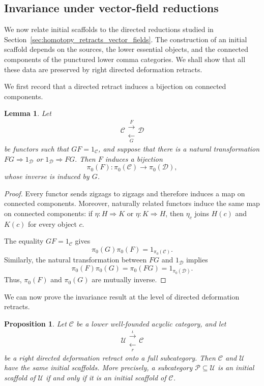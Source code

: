 \documentclass[12pt]{amsart}
\newtheorem{lemma}[teo]{Lemma}
\newtheorem{proposition}[teo]{Proposition}
\theoremstyle{definition}
\theoremstyle{remark}
\numberwithin{figure}{section}%
\newcommand{\CC}{\mathcal{C}}
\newcommand{\Dc}{\mathcal{D}}
\newcommand{\Uc}{\mathcal{U}}
\begin{document}
\subsection{Invariance under vector-field reductions}

We now relate initial scaffolds to the directed reductions studied in
Section~\ref{sec:homotopy_retracts_vector_fields}. The construction of an
initial scaffold depends on the sources, the lower essential objects, and
the connected components of the punctured lower comma categories. We shall
show that all these data are preserved by right directed deformation
retracts.

We first record that a directed retract induces a bijection on connected
components.

\begin{lemma}\label{lem:directed_retract_components}
Let
\[
\CC
\mathrel{\substack{\xrightarrow{F}\\[-1mm]\xleftarrow[G]{}}}
\Dc
\]
be functors such that \(GF=1_\CC\), and suppose that there is a natural
transformation
\(
FG\Rightarrow1_\Dc
\)
or
\(
1_\Dc\Rightarrow FG.
\)
Then \(F\) induces a bijection
\[
\pi_0(F)\colon\pi_0(\CC)\longrightarrow\pi_0(\Dc),
\]
whose inverse is induced by \(G\).
\end{lemma}

\begin{proof}
Every functor sends zigzags to zigzags and therefore induces a map on
connected components. Moreover, naturally related functors induce the
same map on connected components: if
\(\eta\colon H\Rightarrow K\) or \(\eta\colon K\Rightarrow H\), then
\(\eta_c\) joins \(H(c)\) and \(K(c)\) for every object \(c\).

The equality \(GF=1_\CC\) gives
\[
\pi_0(G)\pi_0(F)
=
1_{\pi_0(\CC)}.
\]
Similarly, the natural transformation between \(FG\) and \(1_\Dc\)
implies
\[
\pi_0(F)\pi_0(G)
=
\pi_0(FG)
=
1_{\pi_0(\Dc)}.
\]
Thus, \(\pi_0(F)\) and \(\pi_0(G)\) are mutually inverse.
\end{proof}

We can now prove the invariance result at the level of directed
deformation retracts.

\begin{proposition}\label{prop:right_retract_preserves_scaffolds}
Let \(\CC\) be a lower well-founded acyclic category, and let
\[
\Uc
\mathrel{\substack{\xrightarrow{\iota}\\[-1mm]\xleftarrow[r]{}}}
\CC
\]
be a right directed deformation retract onto a full subcategory. Then
\(\CC\) and \(\Uc\) have the same initial scaffolds. More precisely, a
subcategory \(\mathcal{P}\subseteq\Uc\) is an initial scaffold of \(\Uc\) if and
only if it is an initial scaffold of \(\CC\).
\end{proposition}
\end{document}
